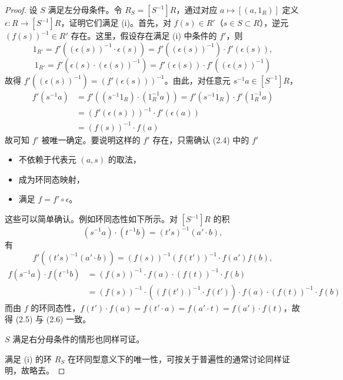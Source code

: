 \begin{proof}
设 $S$ 满足左分母条件。令 $R_S=[S^{-1}]R$，通过对应 $a\mapsto[(a,1_R)]$ 定义 $\epsilon\colon R\to[S^{-1}]R$，证明它们满足 (i)。首先，对 $f(s)\in R'$（$s\in S\subset R$），逆元 $(f(s))^{-1}\in R'$ 存在。这里，假设存在满足 (i) 中条件的 $f'$，则
\[
  1_{R'}=f'((\epsilon(s))^{-1}\cdot\epsilon(s))=f'((\epsilon(s))^{-1})\cdot f'(\epsilon(s)),
\]
\[
  1_{R'}=f'(\epsilon(s)\cdot(\epsilon(s))^{-1})=f'(\epsilon(s))\cdot f'((\epsilon(s))^{-1})
\]
故得 $f'((\epsilon(s))^{-1})=(f'(\epsilon(s)))^{-1}$。由此，对任意元 $s^{-1}a\in[S^{-1}]R$，
\begin{equation}
  \begin{aligned}
    f'(s^{-1}a) &= f'((s^{-1}1_R)\cdot(1_R^{-1}a))=f'(s^{-1}1_R)\cdot f'(1_R^{-1}a)\\
                &= (f'(\epsilon(s)))^{-1}\cdot f'(\epsilon(a))\\
                &= (f(s))^{-1}\cdot f(a)
  \end{aligned}
  \tag{2.4}
\end{equation}
故可知 $f'$ 被唯一确定。要说明这样的 $f'$ 存在，只需确认 (2.4) 中的 $f'$
\begin{itemize}
  \item 不依赖于代表元 $(a,s)$ 的取法，
  \item 成为环同态映射，
  \item 满足 $f=f'\circ\epsilon$。
\end{itemize}
这些可以简单确认。例如环同态性如下所示。对 $[S^{-1}]R$ 的积
\[
  (s^{-1}a)\cdot(t^{-1}b)=(t's)^{-1}(a'\cdot b),
\]
有
\begin{equation}
  f'((t's)^{-1}(a'\cdot b))=(f(s))^{-1}(f(t'))^{-1}\cdot f(a')f(b), \tag{2.5}
\end{equation}
\begin{equation}
  \begin{aligned}
    f(s^{-1}a)\cdot f(t^{-1}b) &= (f(s))^{-1}\cdot f(a)\cdot(f(t))^{-1}\cdot f(b)\\
    &= (f(s))^{-1}\cdot\left((f(t'))^{-1}\cdot f(t')\right)\cdot f(a)\cdot(f(t))^{-1}\cdot f(b)
  \end{aligned}
  \tag{2.6}
\end{equation}
而由 $f$ 的环同态性，$f(t')\cdot f(a)=f(t'\cdot a)=f(a'\cdot t)=f(a')\cdot f(t)$，故得 (2.5) 与 (2.6) 一致。

$S$ 满足右分母条件的情形也同样可证。

满足 (i) 的环 $R_S$ 在环同型意义下的唯一性，可按关于普遍性的通常讨论同样证明，故略去。
\end{proof}


